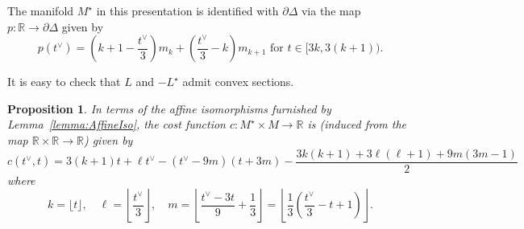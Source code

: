 \documentclass{article}
\newcommand{\RR}{\mathbb{R}}
\newtheorem{prop}{Proposition}
\begin{document}
The manifold $M^\star$ in this presentation is identified with $\partial \Delta$ via the map $p:\RR\to \partial\Delta$ given by 
\[
p(t^\vee) = \left(k+1-\frac{t^\vee}{3}\right)m_k + \left(\frac{t^\vee}{3}-k\right)m_{k+1} \textrm{ for } t\in[3k,3(k+1)).
\]


It is easy to check that $L$ and $-L^\star$ admit convex sections. 
\begin{prop}
    In terms of the affine isomorphisms furnished by Lemma~\ref{lemma:AffineIso}, the cost function $c:M^\star\times M \to \RR$ is (induced from the map $\RR\times\RR \to \RR$) given by
    \[
c(t^\vee,t) = 3(k+1)t + \ell t^\vee-(t^\vee -9m)(t+3m) - \frac{3k(k+1)+3\ell(\ell+1)+9m(3m-1)}{2}
\]
where
\[
k= \lfloor t \rfloor, \quad \ell = \left\lfloor \frac{t^\vee}{3}\right\rfloor, \quad m =\left \lfloor \frac{t^\vee-3t}{9}+\frac{1}{3}\right\rfloor = \left\lfloor \frac{1}{3}\left(\frac{t^\vee}{3}-t + 1 \right)\right\rfloor.
\]
\end{prop}
\end{document}
